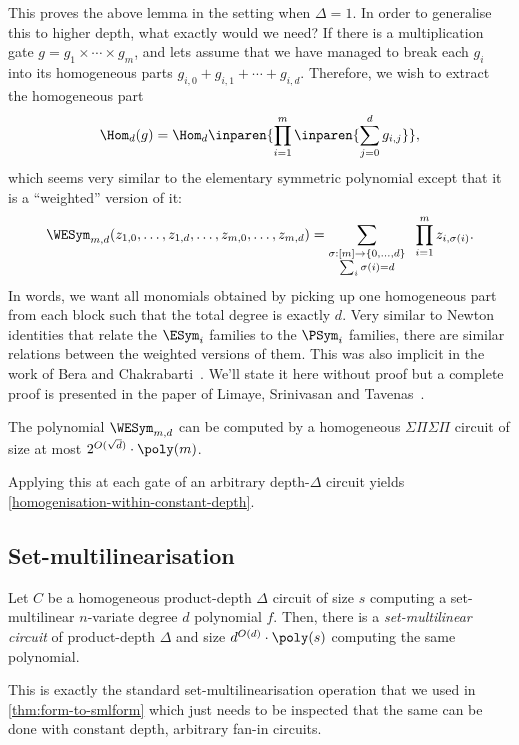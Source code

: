 This proves the above lemma in the setting when $\Delta = 1$. In order to generalise this to higher depth, what exactly would we need? If there is a multiplication gate $g = g_1 \times \cdots \times g_m$, and lets assume that we have managed to break each $g_i$ into its homogeneous parts $g_{i,0} + g_{i,1} + \cdots + g_{i,d}$. Therefore, we wish to extract the homogeneous part
\[
  \Hom_d(g) = \Hom_d\inparen{\prod_{i=1}^m \inparen{\sum_{j=0}^d g_{i,j}}},
\]
which seems very similar to the elementary symmetric polynomial except that it is a ``weighted'' version of it:
\[
  \WESym_{m,d}( z_{1,0}, \ldots, z_{1,d}, \ldots, z_{m,0}, \ldots, z_{m,d}) = \sum_{\substack{\sigma: [m]\rightarrow \{0,\ldots, d\}\\ \sum_{i} \sigma(i) = d}} \;\;\prod_{i=1}^m z_{i, \sigma(i)}.
\]
In words, we want all monomials obtained by picking up one homogeneous part from each block such that the total degree is exactly $d$. Very similar to Newton identities that relate the $\ESym_i$ families to the $\PSym_i$ families, there are similar relations between the weighted versions of them. This was also implicit in the work of Bera and Chakrabarti~\cite{BC15}. We'll state it here without proof but a complete proof is presented in the paper of Limaye, Srinivasan and Tavenas~\cite{LST21}.

\begin{lemmawp}[\cite{BC15}]
  The polynomial $\WESym_{m,d}$ can be computed by a homogeneous $\Sigma\Pi\Sigma\Pi$ circuit of size at most $2^{O(\sqrt{d})} \cdot \poly(m)$. 
\end{lemmawp}

Applying this at each gate of an arbitrary depth-$\Delta$ circuit yields \autoref{homogenisation-within-constant-depth}.

\subsection{Set-multilinearisation}

\begin{lemma}
  \label{lem:set-multilinearisation-constant-depth}
  Let $C$ be a homogeneous product-depth $\Delta$ circuit of size $s$ computing a set-multilinear $n$-variate degree $d$ polynomial $f$. Then, there is a \emph{set-multilinear circuit} of product-depth $\Delta$ and size $d^{O(d)} \cdot \poly(s)$ computing the same polynomial. 
\end{lemma}

This is exactly the standard set-multilinearisation operation that we used in \autoref{thm:form-to-smlform} which just needs to be inspected that the same can be done with constant depth, arbitrary fan-in circuits.

